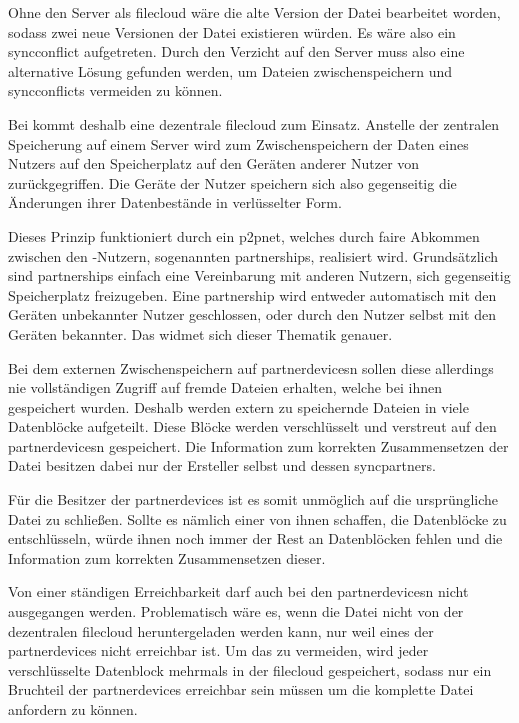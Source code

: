 Ohne den Server als \gls{filecloud} wäre die alte Version der Datei bearbeitet worden, sodass zwei
neue Versionen der Datei existieren würden. Es wäre also ein \gls{syncconflict} aufgetreten.
Durch den Verzicht auf den Server muss also eine alternative Lösung gefunden werden,
um Dateien zwischenspeichern und \glspl{syncconflict} vermeiden zu können.

Bei \sblit kommt deshalb eine dezentrale \gls{filecloud} zum Einsatz. Anstelle
der zentralen Speicherung auf einem Server wird zum Zwischenspeichern der Daten eines
Nutzers auf den Speicherplatz auf den Geräten anderer Nutzer von \sblit zurückgegriffen.
Die Geräte der Nutzer speichern sich also gegenseitig die Änderungen ihrer Datenbestände
in verlüsselter Form.

Dieses Prinzip funktioniert durch ein \gls{p2pnet}, welches durch faire Abkommen zwischen den \sblit-Nutzern,
sogenannten \glspl{partnership}, realisiert wird. Grundsätzlich sind \glspl{partnership} einfach eine
Vereinbarung mit anderen Nutzern, sich gegenseitig Speicherplatz freizugeben.
Eine \gls{partnership} wird entweder automatisch mit den Geräten unbekannter Nutzer
geschlossen, oder durch den Nutzer selbst mit den Geräten bekannter.
Das  widmet sich dieser Thematik genauer.

Bei dem externen Zwischenspeichern auf \glspl{partnerdevice}n sollen diese allerdings
nie vollständigen Zugriff auf fremde Dateien erhalten, welche bei ihnen gespeichert
wurden. Deshalb werden extern zu speichernde Dateien in viele Datenblöcke aufgeteilt.
Diese Blöcke werden verschlüsselt und verstreut auf den \glspl{partnerdevice}n gespeichert.
Die Information zum korrekten Zusammensetzen der Datei besitzen dabei nur der Ersteller selbst und dessen
\glspl{syncpartner}.

Für die Besitzer der \glspl{partnerdevice} ist es somit unmöglich auf die ursprüngliche
Datei zu schließen. Sollte es nämlich einer von ihnen schaffen, die Datenblöcke zu
entschlüsseln, würde ihnen noch immer der Rest an Datenblöcken fehlen und die Information
zum korrekten Zusammensetzen dieser.

Von einer ständigen Erreichbarkeit darf auch bei den \glspl{partnerdevice}n nicht
ausgegangen werden. Problematisch wäre es, wenn die Datei nicht von der dezentralen
\gls{filecloud} heruntergeladen werden kann, nur weil eines der \glspl{partnerdevice}
nicht erreichbar ist. Um das zu vermeiden, wird jeder verschlüsselte Datenblock mehrmals
 in der \gls{filecloud} gespeichert, sodass nur ein Bruchteil der
\glspl{partnerdevice} erreichbar sein müssen um die komplette Datei anfordern zu können.

